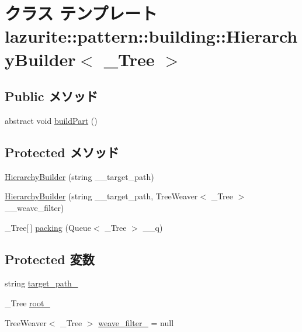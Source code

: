 \hypertarget{classlazurite_1_1pattern_1_1building_1_1_hierarchy_builder_3_01___tree_01_4}{
\section{クラス テンプレート lazurite::pattern::building::HierarchyBuilder$<$ \_\-Tree $>$}
\label{classlazurite_1_1pattern_1_1building_1_1_hierarchy_builder_3_01___tree_01_4}
}
\subsection*{Public メソッド}
\begin{DoxyCompactItemize}
\item 
abstract void \hyperlink{classlazurite_1_1pattern_1_1building_1_1_hierarchy_builder_3_01___tree_01_4_a388c372979909c24afe69939be511c33}{buildPart} ()
\end{DoxyCompactItemize}
\subsection*{Protected メソッド}
\begin{DoxyCompactItemize}
\item 
\hyperlink{classlazurite_1_1pattern_1_1building_1_1_hierarchy_builder_3_01___tree_01_4_a38d22da8097b1cb2703979c62c69e0cd}{HierarchyBuilder} (string \_\-\_\-target\_\-path)
\item 
\hyperlink{classlazurite_1_1pattern_1_1building_1_1_hierarchy_builder_3_01___tree_01_4_a4166ce2beb0880a9d57696de197e5854}{HierarchyBuilder} (string \_\-\_\-target\_\-path, TreeWeaver$<$ \_\-Tree $>$ \_\-\_\-weave\_\-filter)
\item 
\_\-Tree\mbox{[}$\,$\mbox{]} \hyperlink{classlazurite_1_1pattern_1_1building_1_1_hierarchy_builder_3_01___tree_01_4_a5440abb1c9c6480b24e4c31fae434c3c}{packing} (Queue$<$ \_\-Tree $>$ \_\-\_\-q)
\end{DoxyCompactItemize}
\subsection*{Protected 変数}
\begin{DoxyCompactItemize}
\item 
string \hyperlink{classlazurite_1_1pattern_1_1building_1_1_hierarchy_builder_3_01___tree_01_4_ada0990fc059fbd69219012cbf946a83c}{target\_\-path\_\-}
\item 
\_\-Tree \hyperlink{classlazurite_1_1pattern_1_1building_1_1_hierarchy_builder_3_01___tree_01_4_a63792cc772647cdb88423ec306d86bf2}{root\_\-}
\item 
TreeWeaver$<$ \_\-Tree $>$ \hyperlink{classlazurite_1_1pattern_1_1building_1_1_hierarchy_builder_3_01___tree_01_4_a587334503ef9cb9cd3390f21d93feeb6}{weave\_\-filter\_\-} = null
\end{DoxyCompactItemize}
